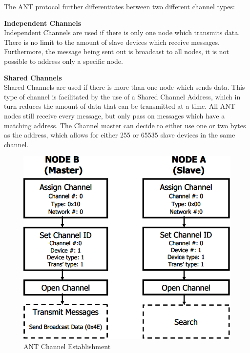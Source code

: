 The ANT protocol further differentiates between two different channel types:
\begin{description}
	\item{\textbf{Independent Channels}} \hfill \\ Independent Channels are used if there is only one node which transmits data. There is no limit to the amount of slave devices which receive messages. Furthermore, the message being sent out is broadcast to all nodes, it is not possible to address only a specific node.
	\item{\textbf{Shared Channels}} \hfill \\ Shared Channels are used if there is more than one node which sends data. This type of channel is facilitated by the use of a Shared Channel Address, which in turn reduces the amount of data that can be transmitted at a time. All ANT nodes still receive every message, but only pass on messages which have a matching address. The Channel master can decide to either use one or two bytes as the address, which allows for either 255 or 65535 slave devices in the same channel. 
\end{description}

\begin{figure}[H]
	\centering
	\includegraphics[scale=0.7]{content/images/ANTsetup.png}
	\caption{ANT Channel Establishment\cite{DynastreamInnovationsInc.2013}}\label{fig:antsetup}
\end{figure}

